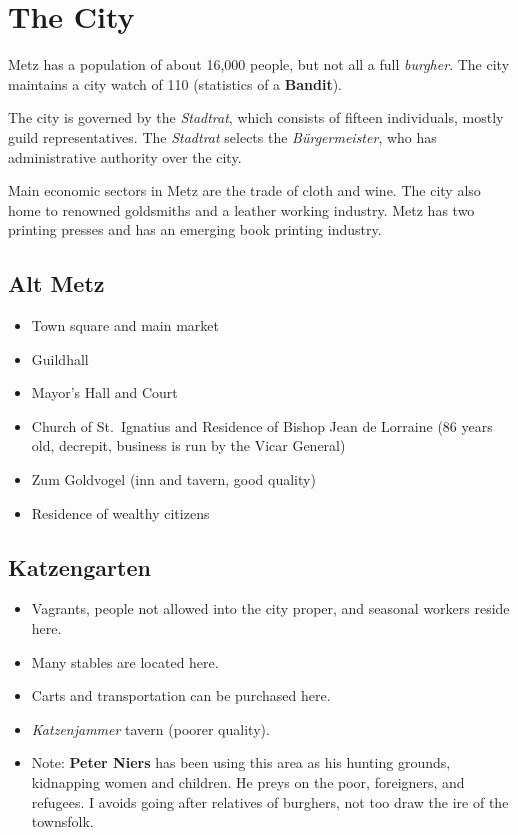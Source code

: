 \documentclass[
]{book}
\begin{document}
\section{The City}\label{the-city}

Metz has a population of about 16,000 people, but not all a full \emph{burgher}. The city maintains a city watch of 110 (statistics of a \textbf{Bandit}).

The city is governed by the \emph{Stadtrat}, which consists of fifteen individuals, mostly guild representatives. The \emph{Stadtrat} selects the \emph{Bürgermeister}, who has administrative authority over the city.

Main economic sectors in Metz are the trade of cloth and wine. The city also home to renowned goldsmiths and a leather working industry. Metz has two printing presses and has an emerging book printing industry.

\subsection{Alt Metz}\label{alt-metz}

\begin{itemize}
\item
  Town square and main market
\item
  Guildhall
\item
  Mayor's Hall and Court
\item
  Church of St.~Ignatius and Residence of Bishop Jean de Lorraine (86 years old, decrepit, business is run by the Vicar General)
\item
  Zum Goldvogel (inn and tavern, good quality)
\item
  Residence of wealthy citizens
\end{itemize}

\subsection{Katzengarten}\label{katzengarten}

\begin{itemize}
\item
  Vagrants, people not allowed into the city proper, and seasonal workers reside here.
\item
  Many stables are located here.
\item
  Carts and transportation can be purchased here.
\item
  \emph{Katzenjammer} tavern (poorer quality).
\item
  Note: \textbf{Peter Niers} has been using this area as his hunting grounds, kidnapping women and children. He preys on the poor, foreigners, and refugees. I avoids going after relatives of burghers, not too draw the ire of the townsfolk.
\end{itemize}
\end{document}

